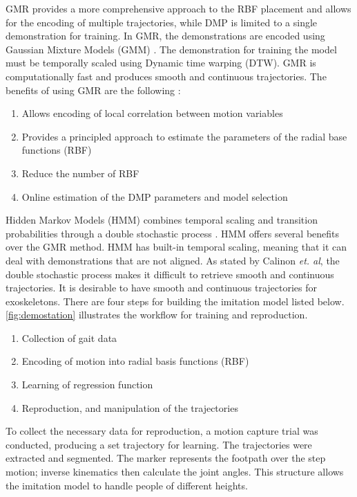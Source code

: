 GMR provides a more comprehensive approach to the RBF placement and allows for the encoding of multiple trajectories, while DMP is limited to a single demonstration for training. In GMR, the demonstrations are encoded using Gaussian Mixture Models (GMM)\cite{calinon2013compliant} \cite{Statisticaldynamical}. The demonstration for training the model must be temporally scaled using Dynamic time warping (DTW). GMR is computationally fast and produces smooth and continuous trajectories. The benefits of using GMR are the following \cite{Calinon}: 

\begin{enumerate}  
    \item Allows encoding of local correlation between motion variables   
    \item Provides a principled approach to estimate the parameters of the radial base functions (RBF) 
    \item Reduce the number of RBF   
    \item Online estimation of the DMP parameters and model selection   
\end{enumerate}  

Hidden Markov Models (HMM) combines temporal scaling and transition probabilities through a double stochastic process \cite{calinon2007learning}. HMM offers several benefits over the GMR method. HMM has built-in temporal scaling, meaning that it can deal with demonstrations that are not aligned. As stated by Calinon \textit{et. al}, the double stochastic process makes it difficult to retrieve smooth and continuous trajectories. It is desirable to have smooth and continuous trajectories for exoskeletons. There are four steps for building the imitation model listed below. \autoref{fig:demostation} illustrates the workflow for training and reproduction.

\begin{enumerate}
    \item Collection of gait data
    \item Encoding of motion into radial basis functions (RBF)
    \item Learning of regression function
    \item Reproduction, and manipulation of the trajectories
\end{enumerate}


To collect the necessary data for reproduction, a motion capture trial was conducted, producing a set trajectory for learning. The trajectories were extracted and segmented. The marker represents the footpath over the step motion; inverse kinematics then calculate the joint angles. This structure allows the imitation model to handle people of different heights.

